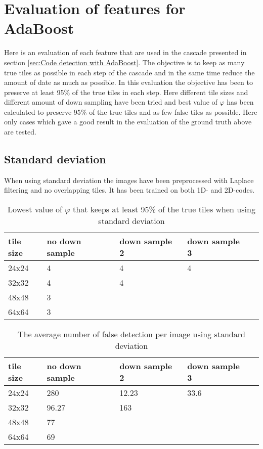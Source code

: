 \section{Evaluation of features for AdaBoost}
\label{sec:Evaluation of features for AdaBoost}
Here is an evaluation of each feature that are used in the cascade presented in section \ref{sec:Code detection with AdaBoost}. The objective is to keep as many true tiles as possible in each step of the cascade and in the same time reduce the amount of date as much as possible. In this evaluation the objective has been to preserve at least 95\% of the true tiles in each step. Here different tile sizes and different amount of down sampling have been tried and best value of $\varphi$ has been calculated to preserve 95\% of the true tiles and as few false tiles as possible. Here only cases which gave a good result in the evaluation of the ground truth above are tested. 

\subsection{Standard deviation}
When using standard deviation the images have been preprocessed with Laplace filtering and no overlapping tiles. It has been trained on both 1D- and 2D-codes. 

\begin{table}[H]
\begin{center}
     \begin{tabular}{ | l | l | l | l | l |}
     \hline
     tile size & no down sample & down sample 2 & down sample 3 \\ \hline
   	 24x24 & 4 & 4 & 4 			\\ \hline
     32x32 & 4 & 4  & 			\\ \hline
     48x48 & 3 &     &  		\\ \hline
     64x64 & 3 &     &			\\ \hline
     \end{tabular}
\end{center}
\caption{Lowest value of $\varphi$ that keeps at least 95\% of the true tiles when using standard deviation}
\end{table}

\begin{table}[H]
\begin{center}
     \begin{tabular}{ | l | l | l | l | l |}
     \hline
     tile size & no down sample & down sample 2 & down sample 3 \\ \hline
   	 24x24 & 280 & 12.23 & 33.6 	\\ \hline
     32x32 & 96.27 & 163 & 			\\ \hline
     48x48 & 77    &     &  		\\ \hline
     64x64 & 69     &     &			\\ \hline
     \end{tabular}
\end{center}
\caption{The average number of false detection per image using standard deviation}
\end{table}

